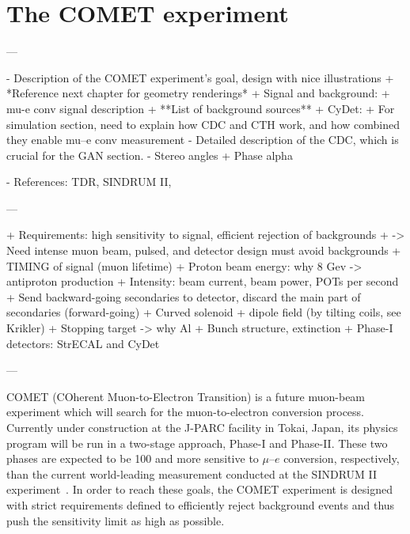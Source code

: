 \chapter{The COMET experiment}\label{chapter2}

\begin{markdown}
---

- Description of the COMET experiment's goal, design with nice illustrations
    + *Reference next chapter for geometry renderings*
    + Signal and background:
        + mu-e conv signal description
        + **List of background sources**
+ CyDet:
    + For simulation section, need to explain how CDC and CTH work, and how combined they enable mu--e conv measurement
    - Detailed description of the CDC, which is crucial for the GAN section.
     - Stereo angles
+ Phase alpha

- References: TDR, SINDRUM II, 

---

+ Requirements: high sensitivity to signal, efficient rejection of backgrounds
 + -> Need intense muon beam, pulsed, and detector design must avoid backgrounds
+ TIMING of signal (muon lifetime)
+ Proton beam energy: why 8 Gev -> antiproton production
+ Intensity: beam current, beam power, POTs per second
+ Send backward-going secondaries to detector, discard the main part of secondaries (forward-going)
+ Curved solenoid + dipole field (by tilting coils, see Krikler)
+ Stopping target -> why Al
+ Bunch structure, extinction
+ Phase-I detectors: StrECAL and CyDet

---
\end{markdown}

COMET (COherent Muon-to-Electron Transition) is a future muon-beam experiment
which will search for the muon-to-electron conversion process. Currently under
construction at the J-PARC facility in Tokai, Japan, its physics program will be
run in a two-stage approach, Phase-I and Phase-II. These two phases are expected
to be 100 and  more sensitive to $\mu$--$e$ conversion,
respectively, than the current world-leading measurement conducted at the
SINDRUM II experiment~\cite{Bertl:2006up}. In order to reach these goals, the
COMET experiment is designed with strict requirements defined to efficiently
reject background events and thus push the sensitivity limit as high as
possible.

